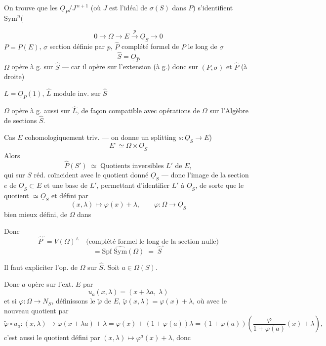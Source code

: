 \documentclass[11pt,a4paper]{article}
\begin{document}
On trouve que les $\underline{O}_P/J^{\,n+1}$ (où $J$ est l'idéal de
$\sigma(S)$ dans $P$) s'identifient \struck{\ill{}}  $\mathrm{Sym}^n($ \ill{}

\[
  0 \longrightarrow \Omega \longrightarrow E \xrightarrow{\;p\;}
  \underline{O}_S \longrightarrow 0
\]
$P = P(E)$, $\sigma$ section définie par $p$, $\widehat{P}$ complété formel de
$P$ le long de $\sigma$
\[
  \widehat{S} = \underline{O}_{\widehat{P}}
\]
$\Omega$ opère à g. sur $\widehat{S}$ --- car il opère sur l'extension (à g.)
donc sur $(P,\sigma)$ et $\widehat{P}$ (à droite)

$L = \underline{O}_P(1)$, $\widehat{L}$ module inv. sur $\widehat{S}$

$\Omega$ opère à g. aussi sur $\widehat{L}$, de façon compatible avec
opérations de $\Omega$ sur l'Algèbre de sections $\widehat{S}$.

Cas $E$  cohomologiquement triv. \ill{} --- on donne un
splitting $s : \underline{O}_S \to E$)
\[
  E^{\circ} \simeq \Omega \times \underline{O}_S
\]
Alors \struck{\ill{}}
\[
  \widehat{P}(S') \;\simeq\; \text{Quotients inversibles } L' \text{ de } E,
\]
qui sur $S$ réd. coïncident avec le quotient donné $\underline{O}_S$ --- donc
l'image de la section $e$ de $\underline{O}_S \subset E$ et une base de $L'$,
permettant d'identifier $L'$ à $\underline{O}_S$, de sorte que le quotient
 $\simeq \underline{O}_S$ et défini par
\[
  (x,\lambda) \longmapsto \varphi(x) + \lambda, \qquad
  \varphi : \Omega \longrightarrow \underline{O}_S
\]
bien mieux défini, de $\Omega$ dans 

Donc
\[
  \widehat{P}^{\circ} = V(\Omega)^{\wedge} \quad
  \text{(complété formel le long de la section nulle)}
\]
\[
  = \mathrm{Spf}\;\widehat{\mathrm{Sym}}(\Omega)
  \;=\; \widehat{S}^{\circ}
\]

Il faut expliciter l'op. de $\Omega$ sur $\widehat{S}$. Soit
$a \in \Omega(S)$.

Donc $a$ opère sur l'ext. $E$ par
\[
  u_a(x,\lambda) = (x + \lambda a,\; \lambda)
\]
et si 
$\varphi : \Omega \to N_S$, définissons le \ill{} $\widetilde{\varphi}$ de $E$,
$\widetilde{\varphi}(x,\lambda) = \varphi(x) + \lambda$, où avec le nouveau
quotient par
\[
  \widetilde{\varphi} \circ u_a : (x,\lambda) \longrightarrow
  \varphi(x + \lambda a) + \lambda
  = \varphi(x) + (1 + \varphi(a))\lambda
  = (1 + \varphi(a))\left( \frac{\varphi}{1 + \varphi(a)}(x) + \lambda \right),
\]
c'est aussi le quotient défini par
$(x,\lambda) \longmapsto \varphi^a(x) + \lambda$, donc
\end{document}
